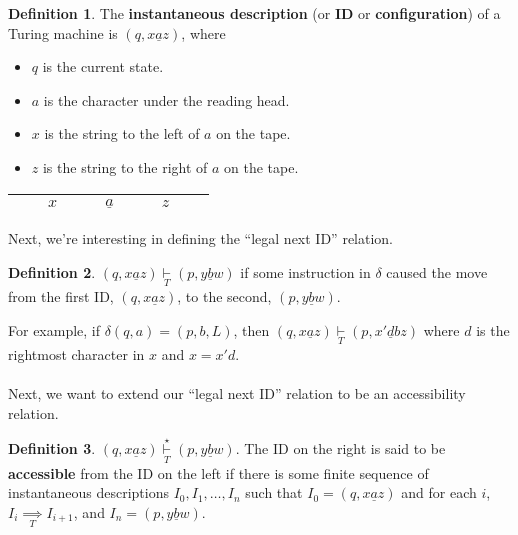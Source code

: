 \documentclass[]{article}
\theoremstyle{definition}
\newtheorem*{defn}{Definition}
\begin{document}
      \begin{defn}
        The \textbf{instantaneous description} (or \textbf{ID} or \textbf{configuration}) of a Turing machine is $(q, x \underline{a}z)$, where
        \begin{itemize}
          \item $q$ is the current state.
          \item $a$ is the character under the reading head.
          \item $x$ is the string to the left of $a$ on the tape.
          \item $z$ is the string to the right of $a$ on the tape.
        \end{itemize}

        \begin{center}
          \begin{tabular}{|ccccc|c|ccccc|}
            \hline
            & & $x$ & & & $\underline{a}$ & & & $z$ & & \\ \hline
          \end{tabular}
        \end{center}
      \end{defn}

    Next, we're interesting in defining the ``legal next ID'' relation.

    \begin{defn}
      $(q, x\underline{a}z) \underset{T}{\vdash} (p, y\underline{b}w)$ if some instruction in $\delta$ caused the move from the first ID, $(q, x\underline{a}z)$, to the second, $(p, y\underline{b}w)$.
    \end{defn}

    For example, if $\delta(q, a) = (p, b, L)$, then $(q, x\underline{a}z) \underset{T}{\vdash} (p, x'\underline{d}bz)$ where $d$ is the rightmost character in $x$ and $x = x'd$.
    \\ \\
    Next, we want to extend our ``legal next ID'' relation to be an accessibility relation.

    \begin{defn}
      $(q, x\underline{a}z) \underset{T}{\overset{\star}{\vdash}} (p, y\underline{b}w)$. The ID on the right is said to be \textbf{accessible} from the ID on the left if there is some finite sequence of instantaneous descriptions $I_0, I_1, \ldots, I_n$ such that $I_0 = (q, x\underline{a}z)$ and for each $i$, $I_i \underset{T}{\implies} I_{i + 1}$, and $I_n = (p, y\underline{b}w)$.
    \end{defn}
\end{document}
